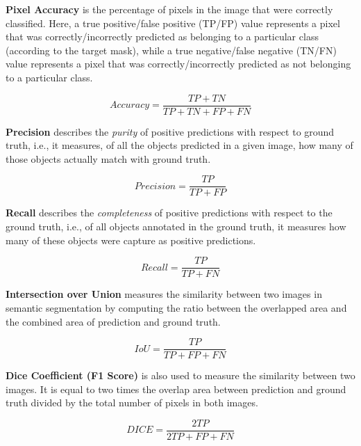 \textbf{Pixel Accuracy} is the percentage of pixels in the image that were correctly classified. Here, a true positive/false positive (TP/FP) value represents a pixel that was correctly/incorrectly predicted as belonging to a particular class (according to the target mask), while a true negative/false negative (TN/FN) value represents a pixel that was correctly/incorrectly predicted as not belonging to a particular class.

\begin{equation}
    Accuracy = \frac{TP+TN}{TP+TN+FP+FN}
\end{equation}

\textbf{Precision} describes the \textit{purity} of positive predictions with respect to ground truth, i.e., it measures, of all the objects predicted in a given image, how many of those objects actually match with ground truth.

\begin{equation}
    Precision = \frac{TP}{TP+FP}
\end{equation}

\textbf{Recall} describes the \textit{completeness} of positive predictions with respect to the ground truth, i.e., of all objects annotated in the ground truth, it measures how many of these objects were capture as positive predictions.

\begin{equation}
    Recall = \frac{TP}{TP+FN}
\end{equation}

\textbf{Intersection over Union} measures the similarity between two images in semantic segmentation by computing the ratio between the overlapped area and the combined area of prediction and ground truth.

\begin{equation}
    IoU = \frac{TP}{TP+FP+FN}
\end{equation}

\textbf{Dice Coefficient (F1 Score)} is also used to measure the similarity between two images. It is equal to two times the overlap area between prediction and ground truth divided by the total number of pixels in both images.

\begin{equation}
    DICE = \frac{2TP}{2TP+FP+FN}
\end{equation}

